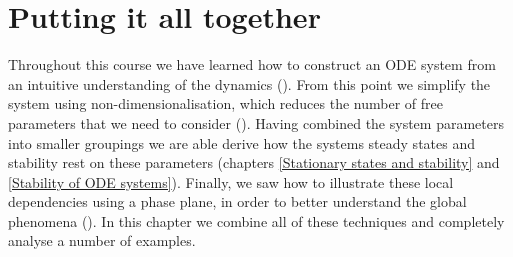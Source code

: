 \chapter{Putting it all together}
Throughout this course we have learned how to construct an ODE system from an intuitive understanding of the dynamics (). From this point we simplify the system using non-dimensionalisation, which reduces the number of free parameters that we need to consider (). Having combined the system parameters into smaller groupings we are able derive how the systems steady states and stability rest on these parameters (chapters \ref{Stationary states and stability} and \ref{Stability of ODE systems}). Finally, we saw how to illustrate these local dependencies using a phase plane, in order to better understand the global phenomena (). In this chapter we combine all of these techniques and completely analyse a number of examples.

